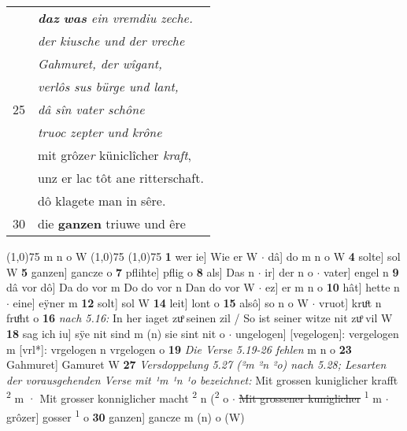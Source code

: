 \documentclass[8pt,a4paper,notitlepage]{article}
\begin{document}
\begin{table}[ht]
\begin{minipage}[t]{0.5\linewidth}
\begin{tabular}{rl}
 & \textit{\textbf{daz} \textbf{was} ein vremdiu zeche.}\\ 
 & \textit{der kiusche und der vreche}\\ 
 & \textit{Gahmuret, der wîgant,}\\ 
 & \textit{verlôs sus bürge und lant,}\\ 
25 & \textit{dâ sîn vater schône}\\ 
 & \textit{truoc zepter und krône}\\ 
 & mit grôze\textit{r} küniclîcher \textit{kraft},\\ 
 & unz er lac tôt ane ritterschaft.\\ 
 & dô klagete man in sêre.\\ 
30 & die \textbf{ganzen} triuwe und êre\\ 
\end{tabular}
\scriptsize
\line(1,0){75} \newline
m n o W \newline
\line(1,0){75} \newline
\newline
\line(1,0){75} \newline
\textbf{1} wer ie] Wie er W  $\cdot$ dâ] do m n o W \textbf{4} solte] sol W \textbf{5} ganzen] gancze o \textbf{7} pflihte] pflig o \textbf{8} als] Das n  $\cdot$ ir] der n o  $\cdot$ vater] engel n \textbf{9} dâ vor dô] Da do vor m Do do vor n Dan do vor W  $\cdot$ ez] er m n o \textbf{10} hât] hette n  $\cdot$ eine] eÿner m \textbf{12} solt] sol W \textbf{14} leit] lont o \textbf{15} alsô] so n o W  $\cdot$ vruot] kruͦt n fruͦht o \textbf{16} \textit{nach 5.16:} In her iaget zuͦ seinen zil / So ist seiner witze nit zuͦ vil W  \textbf{18} sag ich iu] sÿe nit sind m (n) sie sint nit o  $\cdot$ ungelogen] [vegelogen]: vergelogen m [vrl*]: vrgelogen n vrgelogen o \textbf{19} \textit{Die Verse 5.19-26 fehlen} m n o  \textbf{23} Gahmuret] Gamuret W \textbf{27} \textit{Versdoppelung 5.27 (²m ²n ²o) nach 5.28; Lesarten der vorausgehenden Verse mit ¹m ¹n ¹o bezeichnet:} Mit grossen kuniglicher krafft \textsuperscript{2}\hspace{-1.3mm} m  · Mit grosser konniglicher macht \textsuperscript{2}\hspace{-1.3mm} n  (\textsuperscript{2}\hspace{-1.3mm} o   $\cdot$ \sout{Mit grossener kuniglicher} \textsuperscript{1}\hspace{-1.3mm} m  $\cdot$ grôzer] gosser \textsuperscript{1}\hspace{-1.3mm} o \textbf{30} ganzen] gancze m (n) o (W) \newline
\end{minipage}
\end{table}
\end{document}
